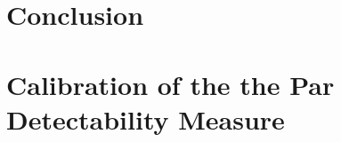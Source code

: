 \documentclass[10pt,twoside,openright,titlepage]{ce}
\begin{document}
\chapter{Conclusion}
\label{ch:conclusion}






\appendix
\chapter{Calibration of the the Par Detectability Measure}
\label{ch:perceptual:implementation:calibration}

\newpage
% 
\end{document}
